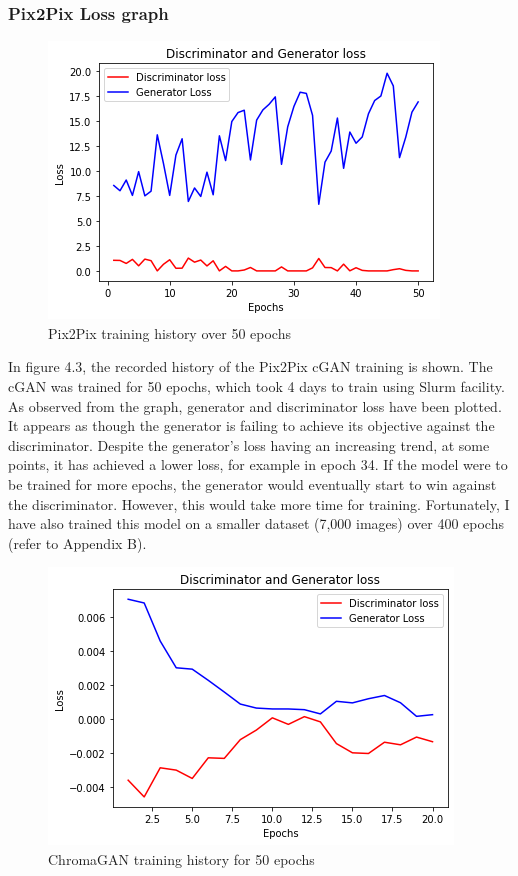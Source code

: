\subsubsection*{Pix2Pix Loss graph}
\begin{figure}[H]
    \centering
    \includegraphics[width=0.7\columnwidth]{sections/figures/pix2pix_history.png}
    \caption{Pix2Pix training history over 50 epochs}
    \label{fig:my_label}
\end{figure}
In figure 4.3, the recorded history of the Pix2Pix cGAN training is shown. The cGAN was trained for 50 epochs, which took 4 days to train using Slurm facility. As observed from the graph, generator and discriminator loss have been plotted. It appears as though the generator is failing to achieve its objective against the discriminator. Despite the generator's loss having an increasing trend, at some points, it has achieved a lower loss, for example in epoch 34. If the model were to be trained for more epochs, the generator would eventually start to win against the discriminator. However, this would take more time for training. Fortunately, I have also trained this model on a smaller dataset (7,000 images) over 400 epochs (refer to Appendix B).

\begin{figure}[H]
    \centering
    \includegraphics[width=0.7\columnwidth]{sections/figures/chromagan_history.png}
    \caption{ChromaGAN training history for 50 epochs}
    \label{fig:my_label}
\end{figure}
